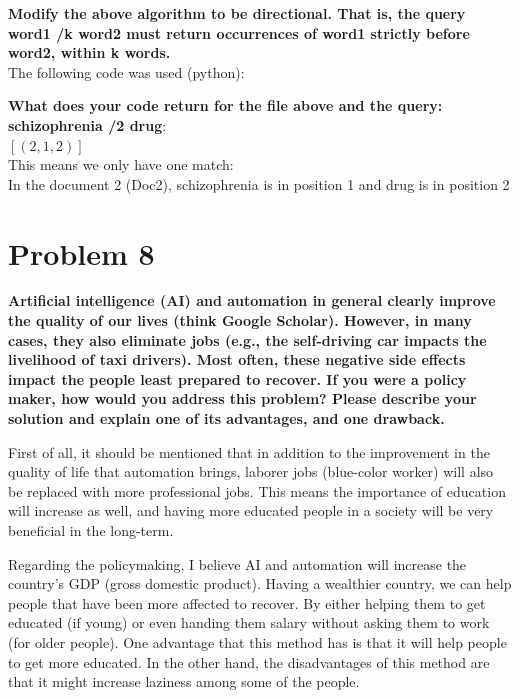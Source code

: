 \documentclass{article}
\begin{document}
\textbf{Modify the above algorithm to be directional. That is, the query word1 /k word2 must return occurrences of word1 strictly before word2, within k words. }
\\
The following code was used (python):


\textbf{What does your code return for the file above and the query:}\\ \textbf{schizophrenia /2 drug}: \\ $[(2, 1, 2)]$ \\
This means we only have one match: \\
In the document 2 (Doc2), schizophrenia is in position 1 and drug is in position 2 

\section{Problem 8}
\textbf{Artificial intelligence (AI) and automation in general clearly improve the quality of our lives (think Google Scholar). However, in many cases, they also eliminate jobs (e.g., the self-driving car impacts the livelihood of taxi drivers). Most often, these negative side effects impact the people least prepared to recover. If you were a policy maker, how would you address this problem? Please describe your solution and explain one of its advantages, and one drawback.}

First of all, it should be mentioned that in addition to the improvement in the quality of life that automation brings, laborer jobs (blue-color worker) will also be replaced with more professional jobs. This means the importance of education will increase as well, and having more educated people in a society will be very beneficial in the long-term. 

Regarding the policymaking, I believe AI and automation will increase the country's GDP (gross domestic product). Having a wealthier country, we can help people that have been more affected to recover. By either helping them to get educated (if young) or even handing them salary without asking them to work (for older people). One advantage that this method has is that it will help people to get more educated. In the other hand, the disadvantages of this method are that it might increase laziness among some of the people.
\end{document}
